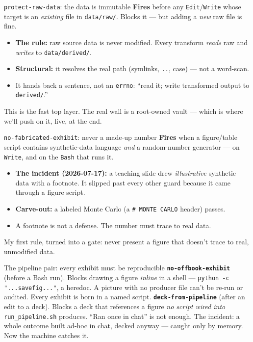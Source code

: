 \documentclass[aspectratio=169,11pt]{beamer}
\begin{document}
\begin{frame}{\texttt{protect-raw-data}: the data is immutable}
\textbf{Fires} before any \texttt{Edit}/\texttt{Write} whose target is an \emph{existing} file in \texttt{data/raw/}. Blocks it --- but adding a \emph{new} raw file is fine.
\vspace{0.3cm}
\begin{itemize}\setlength\itemsep{0.25em}
    \item \textbf{The rule:} raw source data is never modified. Every transform \emph{reads} raw and \emph{writes} to \texttt{data/derived/}.
    \item \textbf{Structural:} it resolves the real path (symlinks, \texttt{..}, case) --- not a word-scan.
    \item It hands back a sentence, not an \texttt{errno}: ``read it; write transformed output to \texttt{derived/}.''
\end{itemize}
\vspace{0.15cm}
\alert{This is the fast top layer. The real wall is a root-owned vault --- which is where we'll push on it, live, at the end.}
\end{frame}

\begin{frame}{\texttt{no-fabricated-exhibit}: never a made-up number}
\textbf{Fires} when a figure/table script contains synthetic-data language \emph{and} a random-number generator --- on \texttt{Write}, and on the \texttt{Bash} that runs it.
\vspace{0.3cm}
\begin{itemize}\setlength\itemsep{0.25em}
    \item \textbf{The incident (2026-07-17):} a teaching slide drew \emph{illustrative} synthetic data with a footnote. It slipped past every other guard because it came through a figure script.
    \item \textbf{Carve-out:} a labeled Monte Carlo (a \texttt{\# MONTE CARLO} header) passes.
    \item A footnote is not a defense. The number must trace to real data.
\end{itemize}
\vspace{0.1cm}
\alert{My first rule, turned into a gate: never present a figure that doesn't trace to real, unmodified data.}
\end{frame}

\begin{frame}{The pipeline pair: every exhibit must be reproducible}
\textbf{\texttt{no-offbook-exhibit}} (before a Bash run). Blocks drawing a figure \emph{inline} in a shell --- \texttt{python -c "...savefig..."}, a heredoc. A picture with no producer file can't be re-run or audited. Every exhibit is born in a named script.
\vspace{0.35cm}
\textbf{\texttt{deck-from-pipeline}} (after an edit to a deck). Blocks a deck that references a figure \emph{no script wired into} \texttt{run\_pipeline.sh} produces. ``Ran once in chat'' is not enough.
\vspace{0.2cm}
\alert{The incident: a whole outcome built ad-hoc in chat, decked anyway --- caught only by memory. Now the machine catches it.}
\end{frame}
\end{document}
